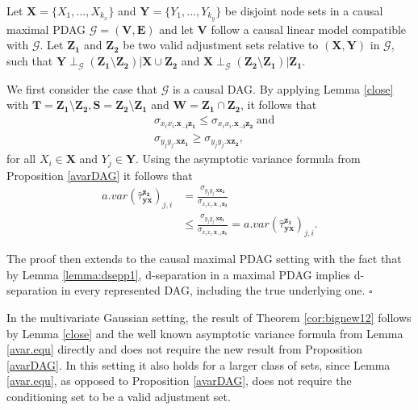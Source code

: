 \documentclass[11pt,a4paper]{article}
\theoremstyle{definition}
\theoremstyle{remark}
\newenvironment{proofof}[1][]{\begin{trivlist}
\item[\hskip \labelsep {\textit{Proof of #1.}}]}{\hfill{}$\square$\end{trivlist}}
\newcommand{\mpdag}{maximal PDAG}
\newcommand{\g}[1][G]{\mathcal{#1}}
\begin{document}
\begin{proofof}[Theorem \ref{cor:bignew12}] Let $\mathbf{X}=\{X_1,\dots,X_{k_x}\}$ and $\mathbf{Y}=\{Y_1,\dots,Y_{k_y}\}$ be disjoint node sets in a causal \mpdag{} $\g=(\mathbf{V},\mathbf{E})$ and let $\mathbf{V}$ follow a causal linear model compatible with $\g$. Let $\mathbf{Z_1}$ and $\mathbf{Z_2}$ be two valid adjustment sets relative to $(\mathbf{X,Y})$ in $\g$, such that $\mathbf{Y} \perp_{\g} (\mathbf{Z_1} \setminus \mathbf{Z_2}) | \mathbf{X} \cup \mathbf{Z_2} $ and $\mathbf{X} \perp_{\g} (\mathbf{Z_2} \setminus \mathbf{Z_1}) | \mathbf{Z_1}$.
	
	We first consider the case that $\g$ is a causal DAG. By applying Lemma \ref{close} with $\mathbf{T}=\mathbf{Z_1} \setminus \mathbf{Z_2},\mathbf{S}=\mathbf{Z_2} \setminus \mathbf{Z_1}$ and $\mathbf{W} = \mathbf{Z_1} \cap \mathbf{Z_2}$, it follows that
	\begin{align}
	&\sigma_{x_ix_i.\mathbf{x_{-i}\mathbf{z_1}}} \leq \sigma_{x_ix_i.\mathbf{x_{-i}\mathbf{z_2}}} \ \textrm{and} \nonumber \\
	&\sigma_{y_jy_j.\mathbf{xz_1}} \geq \sigma_{y_jy_j.\mathbf{xz_2}}, \nonumber 
	\end{align}
	for all $X_i \in \mathbf{X}$ and $Y_j \in \mathbf{Y}$. Using the asymptotic variance formula from Proposition \ref{avarDAG} it follows that
	\begin{align}
	a.var(\hat{\tau}^{\mathbf{z_2}}_{\mathbf{yx}})_{j,i} &= \frac{\sigma_{y_jy_j.\mathbf{xz_2}}}{\sigma_{x_ix_i.\mathbf{x}_{-i}\mathbf{z_2}}} \nonumber \\
	& \leq \frac{\sigma_{y_jy_j.\mathbf{xz_1}}}{\sigma_{x_ix_i.\mathbf{x}_{-i}\mathbf{z_1}}} 
	= a.var(\hat{\tau}^{\mathbf{z_1}}_{\mathbf{yx}})_{j,i}. \nonumber 
	\end{align}
	
	The proof then extends to the causal \mpdag{} setting with the fact that by Lemma \ref{lemma:dsepp1}, d-separation in a \mpdag{} implies d-separation in every represented DAG, including the true underlying one.
\end{proofof}

	In the multivariate Gaussian setting, the result of Theorem \ref{cor:bignew12} follows by Lemma \ref{close}  and the well known asymptotic variance formula from Lemma \ref{avar.equ} directly and does not require the new result from Proposition \ref{avarDAG}. In this setting it also holds for a larger class of sets, since Lemma \ref{avar.equ}, as opposed to Proposition 
	\ref{avarDAG}, does not require the conditioning set to be a valid adjustment set.
\end{document}
